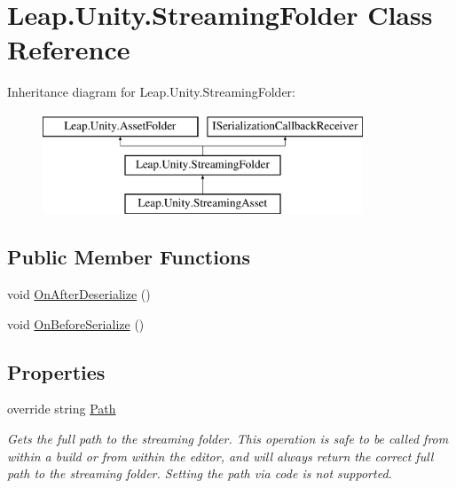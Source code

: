 \hypertarget{class_leap_1_1_unity_1_1_streaming_folder}{}\section{Leap.\+Unity.\+Streaming\+Folder Class Reference}
\label{class_leap_1_1_unity_1_1_streaming_folder}
Inheritance diagram for Leap.\+Unity.\+Streaming\+Folder\+:\begin{figure}[H]
\begin{center}
\leavevmode
\includegraphics[height=3.000000cm]{class_leap_1_1_unity_1_1_streaming_folder}
\end{center}
\end{figure}
\subsection*{Public Member Functions}
\begin{DoxyCompactItemize}
\item 
void \mbox{\hyperlink{class_leap_1_1_unity_1_1_streaming_folder_a9d338a4b87762d482ea95f7c5a5ef292}{On\+After\+Deserialize}} ()
\item 
void \mbox{\hyperlink{class_leap_1_1_unity_1_1_streaming_folder_ab88eea3ab191470aec844e84a659ff3c}{On\+Before\+Serialize}} ()
\end{DoxyCompactItemize}
\subsection*{Properties}
\begin{DoxyCompactItemize}
\item 
override string \mbox{\hyperlink{class_leap_1_1_unity_1_1_streaming_folder_a195bd6dd7475b2bf7836b8ce364c1ad7}{Path}}
\begin{DoxyCompactList}\small\item\em Gets the full path to the streaming folder. This operation is safe to be called from within a build or from within the editor, and will always return the correct full path to the streaming folder. Setting the path via code is not supported. \end{DoxyCompactList}\end{DoxyCompactItemize}
